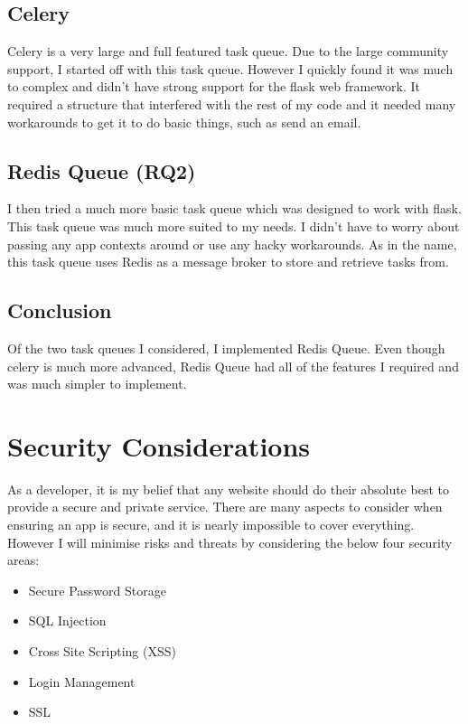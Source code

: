 \documentclass[a4paper,oneside,12pt]{report}
\begin{document}
	\subsection{Celery}
	Celery is a very large and full featured task queue. Due to the large community support, I started off with this task queue.
	However I quickly found it was much to complex and didn't have strong support for the flask web framework. It required a structure that
	interfered with the rest of my code and it needed many workarounds to get it to do basic things, such as send an email.

	\subsection{Redis Queue (RQ2)}
	I then tried a much more basic task queue which was designed to work with flask. This task queue was much more suited to my needs.
	I didn't have to worry about passing any app contexts around or use any hacky workarounds. As in the name, this task queue uses Redis as a message broker to store and retrieve tasks from.

	\subsection{Conclusion}
	Of the two task queues I considered, I implemented Redis Queue. Even though celery is much more advanced, Redis Queue had all of the features I required and was much simpler to implement.	
	
	\section{Security Considerations}
	As a developer, it is my belief that any website should do their absolute best to provide a secure and private service. There are many aspects to consider when ensuring an app is secure, and it is nearly impossible to cover everything. However I will minimise risks and threats by considering the below four security areas:
	\begin{itemize}
		\item Secure Password Storage
		\item SQL Injection
		\item Cross Site Scripting (XSS)
		\item Login Management
		\item SSL
	\end{itemize}
\end{document}
